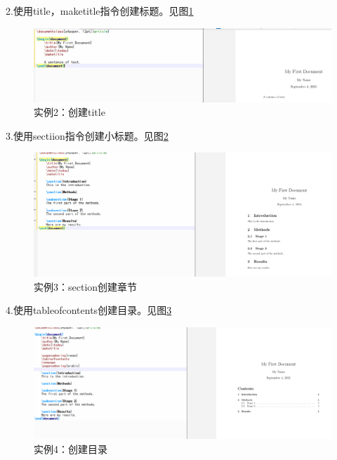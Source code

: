 \documentclass{article}
\begin{document}
	\newpage
	
	2.使用title，maketitle指令创建标题。见图\ref{fig:example4}
	
	\begin{figure}[h]  
		\centering
		\includegraphics[width=1\textwidth]{e.png}
		\caption{实例2：创建title}
		\label{fig:example4}
	\end{figure}
	
	3.使用sectiion指令创建小标题。见图\ref{fig:example5}
	
	\begin{figure}[h]  
		\centering
		\includegraphics[width=1\textwidth]{f.png}
		\caption{实例3：section创建章节}
		\label{fig:example5}
	\end{figure}
	
	4.使用tableofcontents创建目录。见图\ref{fig:example6}
	
	\begin{figure}[h]  
		\centering
		\includegraphics[width=1\textwidth]{g.png}
		\caption{实例4：创建目录}
		\label{fig:example6}
	\end{figure}
	
	\newpage
	
\end{document}
